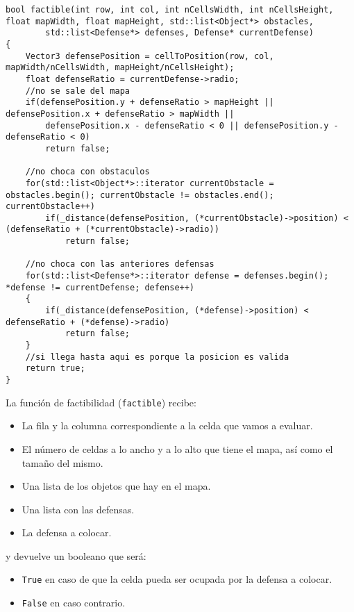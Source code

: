 
\begin{lstlisting}
bool factible(int row, int col, int nCellsWidth, int nCellsHeight, float mapWidth, float mapHeight, std::list<Object*> obstacles, 
        std::list<Defense*> defenses, Defense* currentDefense)
{
    Vector3 defensePosition = cellToPosition(row, col, mapWidth/nCellsWidth, mapHeight/nCellsHeight);
    float defenseRatio = currentDefense->radio;
    //no se sale del mapa 
    if(defensePosition.y + defenseRatio > mapHeight || defensePosition.x + defenseRatio > mapWidth || 
        defensePosition.x - defenseRatio < 0 || defensePosition.y - defenseRatio < 0)
        return false;

    //no choca con obstaculos
    for(std::list<Object*>::iterator currentObstacle = obstacles.begin(); currentObstacle != obstacles.end(); currentObstacle++) 
        if(_distance(defensePosition, (*currentObstacle)->position) < (defenseRatio + (*currentObstacle)->radio))
            return false;

    //no choca con las anteriores defensas
    for(std::list<Defense*>::iterator defense = defenses.begin(); *defense != currentDefense; defense++) 
    {
        if(_distance(defensePosition, (*defense)->position) < defenseRatio + (*defense)->radio)
            return false;
    }
    //si llega hasta aqui es porque la posicion es valida
    return true;
}
\end{lstlisting}

La funci\'on de factibilidad (\texttt{factible}) recibe:
\begin{itemize}
	\item La fila y la columna correspondiente a la celda que vamos a evaluar.
	\item El n\'umero de celdas a lo ancho y a lo alto que tiene el mapa, as\'i como el tamaño del mismo.
	\item Una lista de los objetos que hay en el mapa.
	\item Una lista con las defensas.
	\item La defensa a colocar.
\end{itemize}
y devuelve un booleano que ser\'a:
\begin{itemize}
	\item \texttt{True} en caso de que la celda pueda ser ocupada por la defensa a colocar.
	\item \texttt{False} en caso contrario.
\end{itemize}

